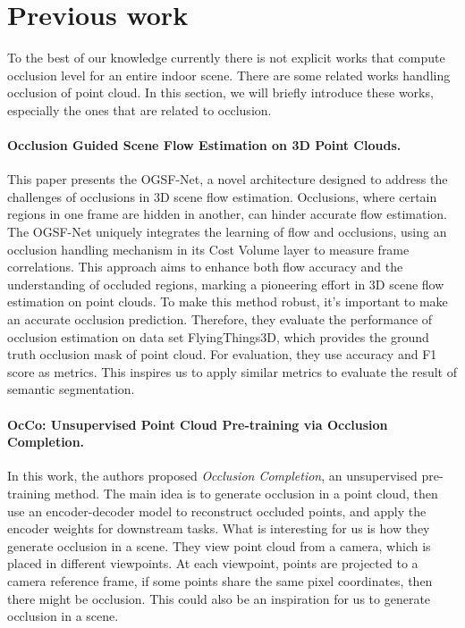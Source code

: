 \documentclass[11pt, a4paper,oneside,chapterprefix=false]{scrbook}
\begin{document}
\section{Previous work}
To the best of our knowledge currently there is not explicit works that compute occlusion level for an entire indoor scene. There are some related works handling occlusion of point cloud. In this section, we will briefly introduce these works, especially the ones that are related to occlusion.  


\paragraph{Occlusion Guided Scene Flow Estimation on 3D Point Clouds.} \label{par:scene flow}

This paper presents the OGSF-Net, a novel architecture designed to address the challenges of occlusions in 3D scene flow estimation. Occlusions, where certain regions in one frame are hidden in another, can hinder accurate flow estimation. The OGSF-Net uniquely integrates the learning of flow and occlusions, using an occlusion handling mechanism in its Cost Volume layer to measure frame correlations. This approach aims to enhance both flow accuracy and the understanding of occluded regions, marking a pioneering effort in 3D scene flow estimation on point clouds. To make this method robust, it's important to make an accurate occlusion prediction. Therefore, they evaluate the performance of occlusion estimation on data set FlyingThings3D, which provides the ground truth occlusion mask of point cloud. For evaluation, they use accuracy and F1 score as metrics. This inspires us to apply similar metrics to evaluate the result of semantic segmentation.

\paragraph{OcCo: Unsupervised Point Cloud Pre-training via Occlusion Completion.} \label{par:OcCo occlusion completion}

In this work, the authors proposed \emph{Occlusion Completion}, an unsupervised pre-training method. The main idea is to generate occlusion in a point cloud, then use an encoder-decoder model to reconstruct occluded points, and apply the encoder weights for downstream tasks. What is interesting for us is how they generate occlusion in a scene. They view point cloud from a camera, which is placed in different viewpoints. At each viewpoint, points are projected to a camera reference frame, if some points share the same pixel coordinates, then there might be occlusion. This could also be an inspiration for us to generate occlusion in a scene.
\end{document}
